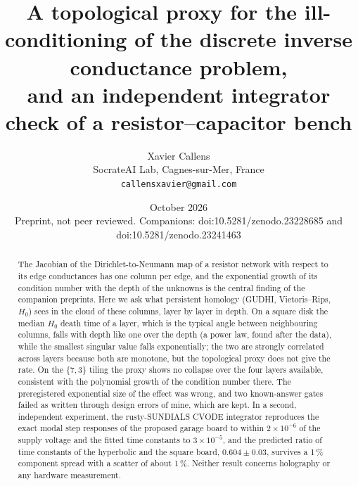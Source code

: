 \documentclass[11pt,a4paper]{article}
\title{A topological proxy for the ill-conditioning of the discrete inverse conductance problem,\\ and an independent integrator check of a resistor--capacitor bench}
\author{Xavier Callens\\[2pt]
\small SocrateAI Lab, Cagnes-sur-Mer, France\\
\small \texttt{callensxavier@gmail.com}}
\date{October 2026 \\ \small Preprint, not peer reviewed. Companions: doi:10.5281/zenodo.23228685 and doi:10.5281/zenodo.23241463}
\begin{document}
\maketitle

\begin{abstract}
The Jacobian of the Dirichlet-to-Neumann map of a resistor network with respect to its edge conductances has one column per edge, and the exponential growth of its condition number with the
depth of the unknowns is the central finding of the companion preprints. Here we ask what persistent homology (GUDHI, Vietoris--Rips, $H_0$) sees in the cloud of these columns, layer by layer in depth.
On a square disk the median $H_0$ death time of a layer, which is the typical angle between neighbouring columns, falls with depth like one over the depth (a power law, found after the data), while the smallest singular
value falls exponentially; the two are strongly correlated across layers because both are monotone, but the topological proxy does not give the rate. On the $\{7,3\}$ tiling the proxy shows no collapse over the four layers available,
consistent with the polynomial growth of the condition number there. The preregistered exponential size of the effect was wrong, and two known-answer gates failed as written through design errors of mine, which are kept. In a second, independent
experiment, the rusty-SUNDIALS CVODE integrator reproduces the exact modal step responses of the proposed garage board to within $2\times10^{-6}$ of the supply voltage and the fitted time constants to $3\times10^{-5}$, and the predicted ratio of time constants of the
hyperbolic and the square board, $0.604\pm0.03$, survives a 1\,\% component spread with a scatter of about 1\,\%. Neither result concerns holography or any hardware measurement.
\end{abstract}
\end{document}
